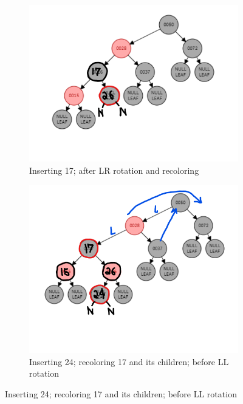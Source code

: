 \documentclass[12pt, a4paper]{article}
\begin{document}
\begin{enumerate}
\begin{figure}[h!]
\begin{subfigure}[b]{0.3\textwidth}
        \label{fig:3-3-a}
      \end{subfigure}
      \hfill
      \begin{subfigure}[b]{0.3\textwidth}
        \centering
        \includegraphics[width=\textwidth]{3-3-b}
        \caption{Inserting 17; after LR rotation and recoloring}
        \label{fig:3-3-b}
      \end{subfigure}
      \hfill
      \begin{subfigure}[b]{0.3\textwidth}
        \centering
        \includegraphics[width=\textwidth]{3-4-a}
        \caption{Inserting 24; recoloring 17 and its children; before LL rotation}
        \label{fig:3-4-a}

\end{subfigure}
\end{figure}
\end{enumerate}
\end{document}
